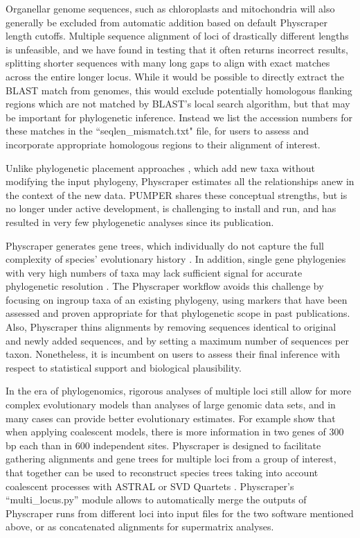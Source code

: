 \documentclass{bmcart}
\begin{document}
Organellar genome sequences, such as chloroplasts and mitochondria will also generally
be excluded from automatic addition based on default Physcraper length cutoffs.
Multiple sequence alignment of loci of drastically different lengths is unfeasible,
and we have found in testing that it often returns incorrect results, splitting
shorter sequences with many long gaps to align with exact matches across the entire
longer locus.
While it would be possible to directly extract the BLAST match from genomes, this
 would exclude potentially homologous flanking regions which are not matched
by BLAST's local search algorithm, but that may be important for phylogenetic inference.
Instead we list the accession numbers for these matches in the ``seqlen\_mismatch.txt"
file, for users to assess and incorporate appropriate homologous regions to their
alignment of interest.

Unlike phylogenetic placement approaches \cite{berger_performance_2011, matsen_pplacer_2010},
which add new taxa without modifying the input phylogeny, Physcraper estimates all
the relationships anew in the context of the new data.
PUMPER \cite{izquierdo2014pumper} shares these conceptual strengths, but is no
longer under active development, is challenging to install and run, and has resulted
in very few phylogenetic analyses since its publication.

Physcraper generates gene trees, which individually do not capture the full complexity
of species' evolutionary history \cite{song2012resolving}. In addition, single gene
phylogenies with very high numbers of taxa may lack sufficient signal
for accurate phylogenetic resolution \cite{morel_phylogenetic_2020}.
The Physcraper workflow avoids this challenge by focusing on ingroup
taxa of an existing phylogeny, using markers that have been assessed and proven
appropriate for that phylogenetic scope in past publications.
Also, Physcraper thins alignments by removing sequences identical to original
and newly added sequences, and by setting a maximum number of sequences per taxon.
Nonetheless, it is incumbent on users to assess their final inference with respect
to statistical support and biological plausibility.

In the era of phylogenomics, rigorous analyses of multiple loci still allow for
more complex evolutionary models
than analyses of large genomic data sets, and in many cases can provide better evolutionary estimates.
For example \cite{zhu_complexity_2021} show that when applying coalescent models,
there is more information in two genes of 300 bp each than in 600 independent sites.
Physcraper is designed to facilitate
gathering alignments and gene trees for multiple loci from a group of interest,
that together can be used to reconstruct species trees taking into account coalescent
processes with ASTRAL \cite{mirarab2014astral} or SVD Quartets \cite{chifman2014quartet}.
Physcraper's ``multi\_locus.py'' module allows to automatically
merge the outputs of Physcraper runs from different loci into input files for the
two software mentioned above, or as concatenated alignments for supermatrix analyses.
\end{document}
